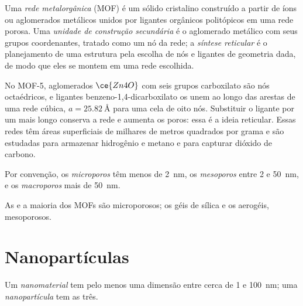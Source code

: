 \begin{definition}\label{def:b3:inorganic-materials:mof}
Uma \emph{rede metalorgânica} (MOF) é um
sólido cristalino construído a partir de íons ou aglomerados metálicos unidos por ligantes
orgânicos politópicos em uma rede porosa. Uma \emph{unidade de construção
secundária} é o aglomerado metálico com seus
grupos coordenantes, tratado como um nó da rede; a \emph{síntese
reticular} é o planejamento de uma estrutura pela escolha de
nós e ligantes de geometria dada, de modo que eles se montem em uma rede escolhida.
\end{definition}

No MOF-5, aglomerados $\ce{Zn4O}$ com seis grupos carboxilato são nós octaédricos,
e ligantes benzeno-1,4-dicarboxilato os unem ao longo das arestas de uma rede
cúbica, $a = \qty{25.82}{\angstrom}$ para uma cela de oito nós. Substituir o ligante por um mais
longo conserva a rede e aumenta os poros: essa é a ideia reticular. Essas
redes têm áreas superficiais de milhares de metros quadrados por grama e são
estudadas para armazenar hidrogênio e metano e para capturar dióxido de carbono.

\begin{definition}\label{def:b3:inorganic-materials:pores}
Por convenção, os \emph{microporos} têm menos de \qty{2}{nm},
os \emph{mesoporos} entre 2 e \qty{50}{nm}, e
os \emph{macroporos} mais de \qty{50}{nm}.
\end{definition}

As  e a maioria dos MOFs são microporosos; os géis de sílica e os aerogéis, mesoporosos.

\section{Nanopartículas}

\begin{definition}[Nanomateriais]\label{def:b3:inorganic-materials:nano}
Um \emph{nanomaterial} tem pelo menos uma dimensão entre
cerca de 1 e \qty{100}{nm}; uma \emph{nanopartícula} tem as
três.
\end{definition}

